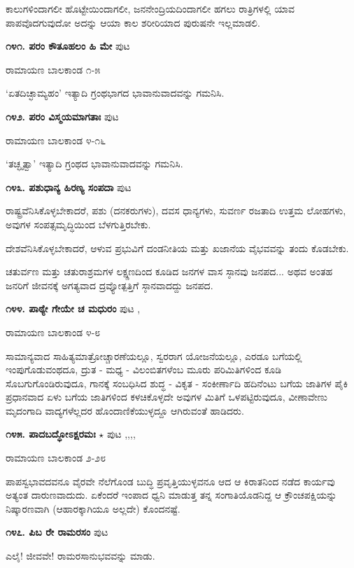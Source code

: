 ಕಾಲುಗಳಿಂದಾಗಲೀ ಹೊಟ್ಟೇಯಿಂದಾಗಲೀ, ಜನನೇಂದ್ರಿಯದಿಂದಾಗಲೀ ಹಗಲು ರಾತ್ರಿಗಳಲ್ಲಿ ಯಾವ ಪಾಪವೊದಗುವುದೋ ಅದನ್ನು ಆಯಾ ಕಾಲ ಶರೀರಿಯಾದ ಪುರುಷನೇ ಇಲ್ಲಮಾಡಲಿ.

\medskip
\noindent\textbf{೧೪೧. ಪರಂ ಕೌತೂಹಲಂ ಹಿ ಮೇ} \hfill ಪುಟ \pageref{163}

\hfill ರಾಮಾಯಣ ಬಾಲಕಾಂಡ ೧-೫

`ಏತದಿಚ್ಛಾಮ್ಯಹಂ' ಇತ್ಯಾದಿ ಗ್ರಂಥಭಾಗದ ಭಾವಾನುವಾದವನ್ನು ಗಮನಿಸಿ.

\medskip
\noindent\textbf{೧೪೨. ಪರಂ ವಿಸ್ಮಯಮಾಗತಾಃ} \hfill ಪುಟ \pageref{211}

\hfill ರಾಮಾಯಣ ಬಾಲಕಾಂಡ ೪-೧೬

`ತಚ್ಛೃತ್ವಾ' ಇತ್ಯಾದಿ ಗ್ರಂಥದ ಭಾವಾನುವಾದವನ್ನು ಗಮನಿಸಿ.

\medskip
\noindent\textbf{೧೪೩. ಪಶುಧಾನ್ಯ ಹಿರಣ್ಯ ಸಂಪದಾ} \hfill ಪುಟ \pageref{227}

ರಾಷ್ಟ್ರವೆನಿಸಿಕೊಳ್ಳಬೇಕಾದರೆ, ಪಶು (ದನಕರುಗಳು), ದವಸ ಧಾನ್ಯಗಳು, ಸುವರ್ಣ ರಜತಾದಿ ಉತ್ತಮ ಲೋಹಗಳು, ಅವುಗಳ ಸಂಪತ್ಸಮೃದ್ಧಿಯಿಂದ ಬೆಳಗುತ್ತಿರಬೇಕು. 

ದೇಶವೆನಿಸಿಕೊಳ್ಳಬೇಕಾದರೆ, ಆಳುವ ಪ್ರಭುವಿಗೆ ದಂಡನೀತಿಯ ಮತ್ತು ಖಜಾನೆಯ ವೈಭವವನ್ನು ತಂದು ಕೊಡಬೇಕು.

ಚತುರ್ವಣ ಮತ್ತು ಚತುರಾಶ್ರಮಗಳ ಲಕ್ಷ್ಣಣದಿಂದ ಕೂಡಿದ ಜನಗಳ ವಾಸ ಸ್ಠಾನವು ಜನಪದ... ಅಥವ ಅಂತಹ ಜನರಿಗೆ ಜೀವನಕ್ಕೆ ಅಗತ್ಯವಾದ ದ್ರವ್ಯೋತ್ಪತ್ತಿಗೆ ಸ್ಠಾನವಾದದ್ದು ಜನಪದ.

\medskip
\noindent\textbf{೧೪೪. ಪಾಠ್ಯೇ ಗೇಯೇ ಚ ಮಧುರಂ} \hfill ಪುಟ \pageref{164},\pageref{250}

\hfill ರಾಮಾಯಣ ಬಾಲಕಾಂಡ ೪-೮

ಸಾಮಾನ್ಯವಾದ ಸಾಹಿತ್ಯಮಾತ್ರೋಚ್ಚಾರಣೆಯಲ್ಲೂ, ಸ್ವರರಾಗ ಯೋಜನೆಯಲ್ಲೂ, ಎರಡೂ ಬಗೆಯಲ್ಲಿ ಇಂಪುಗೊಡುವಂಥದೂ, ದ್ರುತ - ಮಧ್ಯ - ವಿಲಂಬಿತಗಳೆಂಬ ಮೂರು ಪರಿಮಿತಿಗಳಿಂದ ಕೂಡಿ ಸೊಬಗುಗೊಂಡಿರುವುದೂ, ಗಾನಕ್ಕೆ ಸಂಬಧಿಸಿದ ಶುದ್ಧ - ವಿಕೃತ - ಸಂಕೀರ್ಣಾದಿ ಹದಿನೆಂಟು ಬಗೆಯ ಜಾತಿಗಳ ಪೈಕಿ ಪ್ರಧಾನವಾದ ಏಳು ಬಗೆಯ ಜಾತಿಗಳಿಂದ ಕಳಚಿಕೊಳ್ಳದೇ ಅವುಗಳ ಮಿತಿಗೆ ಒಳಪಟ್ಟಿರುವುದೂ, ವೀಣಾವೇಣು ಮೃದಂಗಾದಿ ವಾದ್ಯಗಳೆಲ್ಲದರ  ಹೊಂದಾಣಿಕೆಯುಳ್ಳದ್ದೂ ಆಗಿರುವಂತೆ ಹಾಡಿದರು.

\medskip
\noindent\textbf{೧೪೫. ಪಾದಬದ್ಧೋಽಕ್ಷರಮಃ} $\star$ \hfill ಪುಟ \pageref{20},\pageref{157},\pageref{201},\pageref{213},\pageref{242}

\hfill ರಾಮಾಯಣ ಬಾಲಕಾಂಡ ೨-೨೮

ಪಾಪಸ್ವಭಾವದವನೂ ವೈರವೇ ನೆಲೆಗೊಂಡ ಬುದ್ಧಿ ಪ್ರವೃತ್ತಿಯುಳ್ಳವನೂ ಆದ ಆ ಕಿರಾತನಿಂದ ನಡೆದ ಕಾರ್ಯವು ಅತ್ಯಂತ ದಾರುಣವಾದುದು. ಏಕೆಂದರೆ ಇಂಪಾದ ಧ್ವನಿ ಮಾಡುತ್ತ ತನ್ನ ಸಂಗಾತಿಯೊಡನಿದ್ದ ಆ ಕ್ರೌಂಚಪಕ್ಷಿಯನ್ನು ನಿಷ್ಕಾರಣವಾಗಿ (ಆಹಾರಕ್ಕಾಗಿಯೂ ಅಲ್ಲದೇ) ಕೊಂದನಷ್ಟೆ.

\medskip
\noindent\textbf{೧೪೭. ಪಿಬ ರೇ ರಾಮರಸಂ} \hfill ಪುಟ \pageref{187}

ಎಲೈ! ಜೀವವೇ! ರಾಮರಸಾನುಭವವನ್ನು ಮಾಡು. 

